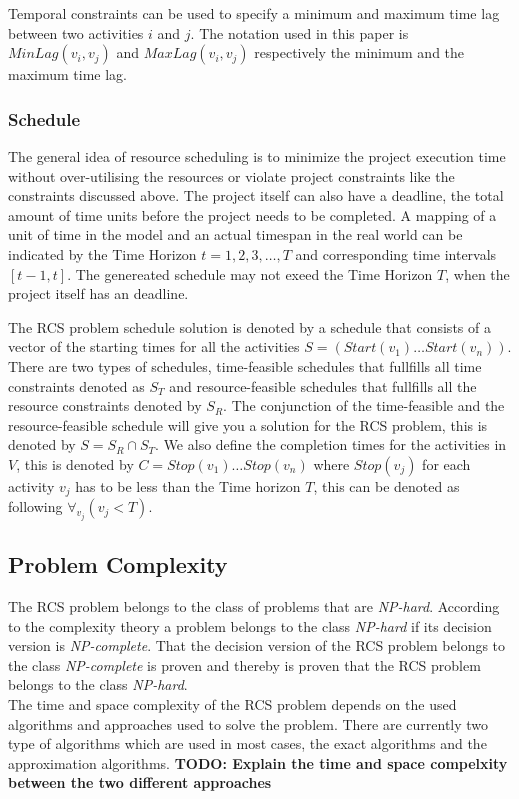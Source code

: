 \documentclass{article}
\newcommand{\TODO}[1]{{\color{red}\textbf{TODO: #1}}}
\begin{document}
Temporal constraints can be used to specify a minimum and maximum time lag between two activities $i$ and $j$. The notation used in this paper is $MinLag(v_i, v_j)$ and $MaxLag(v_i, v_j)$ respectively the minimum and the maximum time lag.

\subsubsection{Schedule}
The general idea of resource scheduling is to minimize the project execution time without over-utilising the resources or violate project constraints like the constraints discussed above. The project itself can also have a deadline, the total amount of time units before the project needs to be completed. A mapping of a unit of time in the model and an actual timespan in the real world can be indicated by the Time Horizon $t=1,2,3,\ldots,T$ and corresponding time intervals $[t-1,t]$. The genereated schedule may not exeed the Time Horizon $T$, when the project itself has an deadline.

The RCS problem schedule solution is denoted by a schedule that consists of a vector of the starting times for all the activities $S =  (Start(v_1) \ldots Start(v_n))$. There are two types of schedules, time-feasible schedules that fullfills all time constraints denoted as $S_T$ and resource-feasible schedules that fullfills all the resource constraints denoted by $S_R$. The conjunction of the time-feasible and the resource-feasible schedule will give you a solution for the RCS problem, this is denoted by $S = S_R \cap S_T$. We also define the completion times for the activities in $V$, this is denoted by $C = Stop(v_1) \ldots Stop(v_n)$ where $Stop(v_j)$ for each activity $v_j$ has to be less than the Time horizon $T$, this can be denoted as following $\forall_{v_j}(v_j < T)$.

\subsection{Problem Complexity}
The RCS problem belongs to the class of problems that are \emph{NP-hard}. According to the complexity theory a problem belongs to the class \emph{NP-hard} if its decision version is \emph{NP-complete}. That the decision version of the RCS problem belongs to the class \emph{NP-complete} is proven and thereby is proven that the RCS problem belongs to the class \emph{NP-hard}. \\
The time and space complexity of the RCS problem depends on the used algorithms and approaches used to solve the problem. There are currently two type of algorithms which are used in most cases, the exact algorithms and the approximation algorithms.
\TODO{Explain the time and space compelxity between the two different approaches}
\end{document}

